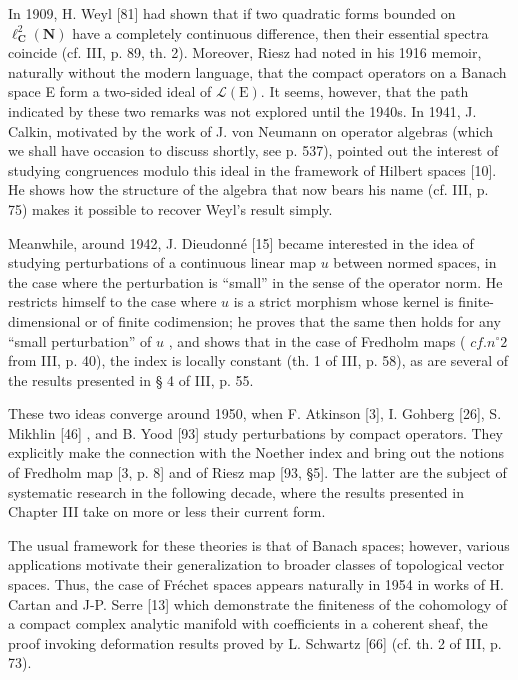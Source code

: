 In 1909, H. Weyl {[}81{]} had shown that if two quadratic forms bounded on \(\ell_{\mathbf{C}}^{2}(\mathbf{N})\) have a completely continuous difference, then their essential spectra coincide (cf. III, p. 89, th. 2). Moreover, Riesz had noted in his 1916 memoir, naturally without the modern language, that the compact operators on a Banach space E form a two-sided ideal of \(\mathcal{L}(\mathrm{E})\). It seems, however, that the path indicated by these two remarks was not explored until the 1940s. In 1941, J. Calkin, motivated by the work of J. von Neumann on operator algebras (which we shall have occasion to discuss shortly, see p. 537), pointed out the interest of studying congruences modulo this ideal in the framework of Hilbert spaces {[}10{]}. He shows how the structure of the algebra that now bears his name (cf. III, p. 75) makes it possible to recover Weyl's result simply.

Meanwhile, around 1942, J. Dieudonné {[}15{]} became interested in the idea of studying perturbations of a continuous linear map \(u\) between normed spaces, in the case where the perturbation is “small” in the sense of the operator norm. He restricts himself to the case where \(u\) is a strict morphism whose kernel is finite-dimensional or of finite codimension; he proves that the same then holds for any “small perturbation” of \(u\) , and shows that in the case of Fredholm maps ( \(cf. n^{\circ} 2\) from III, p. 40), the index is locally constant (th. 1 of III, p. 58), as are several of the results presented in § 4 of III, p. 55.

These two ideas converge around 1950, when F. Atkinson {[}3{]}, I. Gohberg {[}26{]}, S. Mikhlin {[}46{]} , and B. Yood {[}93{]} study perturbations by compact operators. They explicitly make the connection with the Noether index and bring out the notions of Fredholm map {[}3, p. 8{]} and of Riesz map {[}93, §5{]}. The latter are the subject of systematic research in the following decade, where the results presented in Chapter III take on more or less their current form.

The usual framework for these theories is that of Banach spaces; however, various applications motivate their generalization to broader classes of topological vector spaces. Thus, the case of Fréchet spaces appears naturally in 1954 in works of H. Cartan and J-P. Serre {[}13{]} which demonstrate the finiteness of the cohomology of a compact complex analytic manifold with coefficients in a coherent sheaf, the proof invoking deformation results proved by L. Schwartz {[}66{]} (cf. th. 2 of III, p. 73).

